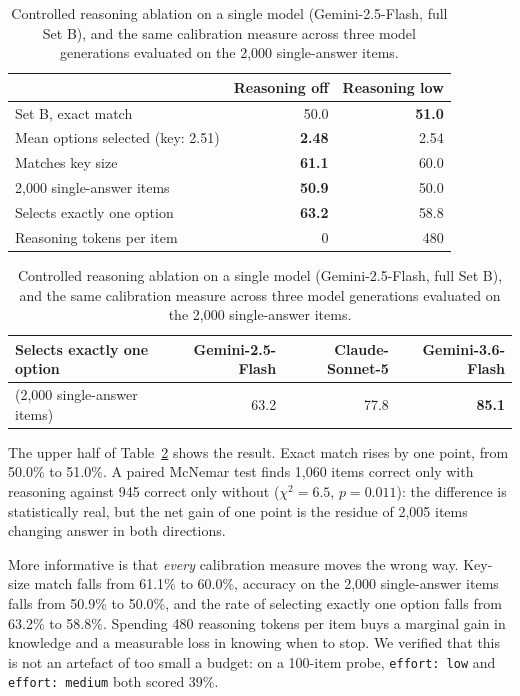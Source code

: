 \documentclass{article} %
\begin{document}
\begin{table}[t]
\caption{Controlled reasoning ablation on a single model (Gemini-2.5-Flash, full Set B),
and the same calibration measure across three model generations evaluated on the 2,000
single-answer items.}
\label{tab:ablation}
\begin{center}
\begin{small}
\begin{tabular}{lrr}
\toprule
 & \textbf{Reasoning off} & \textbf{Reasoning low} \\
\midrule
Set B, exact match            & 50.0 & \textbf{51.0} \\
Mean options selected (key: 2.51) & \textbf{2.48} & 2.54 \\
Matches key size              & \textbf{61.1} & 60.0 \\
2,000 single-answer items     & \textbf{50.9} & 50.0 \\
Selects exactly one option    & \textbf{63.2} & 58.8 \\
Reasoning tokens per item     & 0 & 480 \\
\bottomrule
\end{tabular}

\vspace{1.5em}

\begin{tabular}{lrrr}
\toprule
\textbf{Selects exactly one option} & Gemini-2.5-Flash & Claude-Sonnet-5 & Gemini-3.6-Flash \\
\midrule
(2,000 single-answer items) & 63.2 & 77.8 & \textbf{85.1} \\
\bottomrule
\end{tabular}
\end{small}
\end{center}
\end{table}

The upper half of Table~\ref{tab:ablation} shows the result. Exact match rises by one
point, from 50.0\% to 51.0\%. A paired McNemar test finds 1,060 items correct only with
reasoning against 945 correct only without ($\chi^2 = 6.5$, $p = 0.011$): the difference is
statistically real, but the net gain of one point is the residue of 2,005 items changing
answer in both directions.

More informative is that \emph{every} calibration measure moves the wrong way. Key-size
match falls from 61.1\% to 60.0\%, accuracy on the 2,000 single-answer items falls from
50.9\% to 50.0\%, and the rate of selecting exactly one option falls from 63.2\% to 58.8\%.
Spending 480 reasoning tokens per item buys a marginal gain in knowledge and a measurable
loss in knowing when to stop. We verified that this is not an artefact of too small a
budget: on a 100-item probe, \texttt{effort: low} and \texttt{effort: medium} both scored
39\%.
\end{document}
